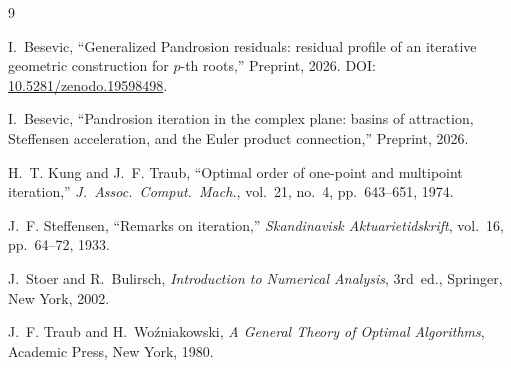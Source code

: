 \documentclass[11pt,a4paper]{article}
\theoremstyle{definition}
\begin{document}
\begin{thebibliography}{9}

I.~Besevic,
``Generalized Pandrosion residuals: residual profile of an iterative geometric construction for $p$-th roots,''
Preprint, 2026.
DOI: \href{https://doi.org/10.5281/zenodo.19598498}{10.5281/zenodo.19598498}.

I.~Besevic,
``Pandrosion iteration in the complex plane: basins of attraction, Steffensen acceleration, and the Euler product connection,''
Preprint, 2026.

H.~T. Kung and J.~F. Traub,
``Optimal order of one-point and multipoint iteration,''
\textit{J.~Assoc.\ Comput.\ Mach.}, vol.~21, no.~4, pp.~643--651, 1974.

J.~F. Steffensen,
``Remarks on iteration,''
\textit{Skandinavisk Aktuarietidskrift}, vol.~16, pp.~64--72, 1933.

J.~Stoer and R.~Bulirsch,
\textit{Introduction to Numerical Analysis},
3rd~ed., Springer, New York, 2002.

J.~F. Traub and H.~Wo\'{z}niakowski,
\textit{A General Theory of Optimal Algorithms},
Academic Press, New York, 1980.

\end{thebibliography}
\end{document}
